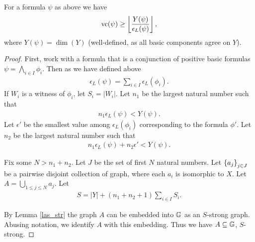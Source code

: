 \begin{Theorem} \label{main_lower}
  For a formula $\psi$ as above we have
  \begin{align*}
    \operatorname{vc} (\psi) \geq \left \lfloor \frac{Y(\psi)}{\epsilon_L(\psi)} \right \rfloor,
  \end{align*}
  where $Y(\psi) = \dim(Y)$ (well-defined, as all basic components agree on $Y$).
\end{Theorem}
\begin{proof}
  First, work with a formula that is a conjunction of positive basic formulas $\psi = \bigwedge_{i \in I} \phi_i$.
  Then as we have defined above
  \begin{align*}
    \epsilon_L(\psi) = \sum_{i \in I} \epsilon_L(\phi_i).
  \end{align*}
  If $W_i$ is a witness of $\phi_i$, let $S_i = |W_i|$.
  Let $n_1$ be the largest natural number such that
  \begin{align*}
    n_1 \epsilon_L(\psi) < Y(\psi).
  \end{align*}
  Let $\epsilon'$ be the smallest value among $\epsilon_L(\phi_i)$ corresponding to the formula $\phi'$.
  Let $n_2$ be the largest natural number such that
  \begin{align*}
    n_1 \epsilon_L(\psi) + n_2 \epsilon' < Y(\psi).
  \end{align*}

  Fix some $N > n_1 + n_2$.
  Let $J$ be the set of first $N$ natural numbers. 
  Let $\left\{a_j\right\}_{j \in J}$ be a pairwise disjoint collection of graph, where each $a_i$ is isomorphic to $X$.
  Let $A = \bigcup_{1 \leq j \leq N} a_j$.
  Let 
  \begin{align*}
    S = |Y| + (n_1 + n_2 + 1) \sum_{i \in I} S_i.
  \end{align*}

  By Lemma \ref{las_str} the graph $A$ can be embedded into $\mathbb G$ as an $S$-strong graph. 
  Abusing notation, we identify $A$ with this embedding.
  Thus we have $A \subseteq \mathbb G$, $S$-strong. 


\end{proof}
